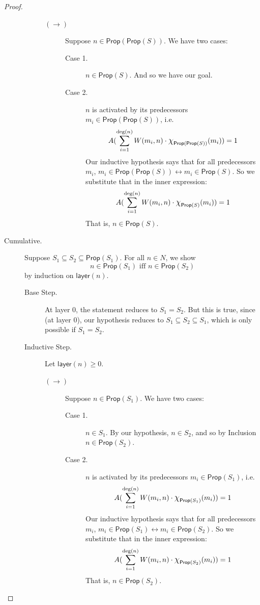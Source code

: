 \documentclass[letterpaper]{article}
\theoremstyle{definition}
\newcommand*{\bigchi}{\mbox{\Large$\chi$}}%
\newcommand{\indegree}[1]{\mathrm{deg}(#1)}
\newcommand{\layer}[1]{\mathsf{layer}(#1)}
\newcommand{\Prop}{\textsf{Prop}}
\begin{document}
\begin{proof}
\begin{description}
\begin{description}
\begin{description}
                \item[$(\rightarrow)$] Suppose $n \in \Prop(\Prop(S))$.  We have two cases:
                \begin{description}
                    \item[Case 1.] $n \in \Prop(S)$.  And so we have our goal.
                    \item[Case 2.] $n$ is activated by its predecessors $m_i \in \Prop(\Prop(S))$, i.e.~
                    \[
                    A(\sum_{i=1}^{\indegree{n}} W(m_i, n) \cdot \bigchi_{\Prop(\Prop(S))}(m_i)) = 1
                    \]
                    Our inductive hypothesis says that for all predecessors $m_i$, $m_i \in \Prop(\Prop(S)) \leftrightarrow m_i \in \Prop(S)$.  So we substitute that in the inner expression:
                    \[
                    A(\sum_{i=1}^{\indegree{n}} W(m_i, n) \cdot \bigchi_{\Prop(S)}(m_i)) = 1
                    \]
                    That is, $n \in \Prop(S)$.
                \end{description}
                
            \end{description}
        \end{description}

        \item[Cumulative.] Suppose $S_1 \subseteq S_2 \subseteq \Prop(S_1)$.  For all $n \in N$, we show
        \[ n \in \Prop(S_1) \mbox{ iff } n \in \Prop(S_2) \]
        by induction on $\layer{n}$.
        \begin{description}
            \item[Base Step.] At layer $0$, the statement reduces to $S_1 = S_2$.  But this is true, since (at layer $0$), our hypothesis reduces to $S_1 \subseteq S_2 \subseteq S_1$, which is only possible if $S_1 = S_2$.
            \item[Inductive Step.] Let $\layer{n} \geq 0$.
            \begin{description}
                
                \item[$(\rightarrow)$] Suppose $n \in \Prop(S_1)$.  We have two cases:
                \begin{description}
                    \item[Case 1.] $n \in S_1$.  By our hypothesis, $n \in S_2$, and so by Inclusion $n \in \Prop(S_2)$.
                    \item[Case 2.] $n$ is activated by its predecessors $m_i \in \Prop(S_1)$, i.e.~
                    \[
                    A(\sum_{i=1}^{\indegree{n}} W(m_i, n) \cdot \bigchi_{\Prop(S_1)}(m_i)) = 1
                    \]
                    Our inductive hypothesis says that for all predecessors $m_i$, $m_i \in \Prop(S_1) \leftrightarrow m_i \in \Prop(S_2)$.  So we substitute that in the inner expression:
                    \[
                    A(\sum_{i=1}^{\indegree{n}} W(m_i, n) \cdot \bigchi_{\Prop(S_2)}(m_i)) = 1
                    \]
                    That is, $n \in \Prop(S_2)$.
                \end{description}
                

\end{description}
\end{description}
\end{description}
\end{proof}
\end{document}
